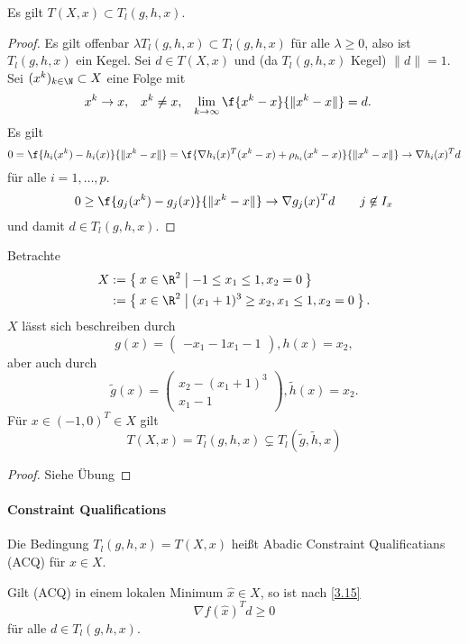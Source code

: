 \begin{lem} \label{3.17}
	Es gilt $T(X, x) \subset T_l(g,h,x)$.
	\begin{proof}
		Es gilt offenbar $\lambda T_l(g,h,x) \subset T_l(g,h,x)$ für alle $\lambda \ge 0$, also ist $T_l(g,h,x)$ ein Kegel.
		Sei $d \in T(X,x)$ und \oBdA (da $T_l(g,h,x)$ Kegel) $\|d\| = 1$.
		Sei $(x^k)_{k\in \N} \subset X$ eine Folge mit
		\begin{align*}
			x^k &\to x, &
			x^k &\neq x, &
			\lim_{k\to\infty} \f{x^k - x}{\|x^k-x\|} &= d.
		\end{align*}
		Es gilt
		\[
			0
			= \f{h_i(x^k) - h_i(x)}{\|x^k - x\|}
			= \f{\nabla h_i(x)^T(x^k-x) + \rho_{h_i}(x^k-x)}{\|x^k-x\|}
			\to \nabla h_i(x)^T d
		\]
		für alle $i = 1, \dotsc, p$.
		\[
			0
			\ge \f{g_j(x^k) - g_j(x)}{\|x^k-x\|}
			\to \nabla g_j(x)^T d
			\qquad j \not\in I_x
		\]
		und damit $d \in T_l(g,h,x)$.
	\end{proof}
\end{lem}

\begin{ex} \label{3.18}
	Betrachte
	\begin{align*}
		X &:= \Set{ x \in \R^2 | -1 \le x_1 \le 1, x_2 = 0 } \\
		&:= \Set{ x \in \R^2 | (x_1 + 1)^3 \ge x_2, x_1 \le 1, x_2 = 0 }.
	\end{align*}
	$X$ lässt sich beschreiben durch
	\[
		g(x) = \begin{pmatrix}
			- x_1 - 1
			x_1 - 1
		\end{pmatrix},
		h(x) = x_2,
	\]
	aber auch durch
	\[
		\tilde g(x) = \begin{pmatrix}
			x_2 - (x_1 + 1)^3 \\
			x_1 - 1
		\end{pmatrix},
		\tilde h(x) = x_2.
	\]
	Für $x \in (-1, 0)^T \in X$ gilt
	\[
		T(X, x) = T_l(g,h,x) \subsetneq T_l(\tilde g, \tilde h, x)
	\]
	\begin{proof}
		Siehe Übung
	\end{proof}
\end{ex}

\paragraph{Constraint Qualifications}

\begin{df} \label{3.19}
	Die Bedingung $T_l(g,h,x) = T(X,x) \label{acq}$ heißt Abadic Constraint Qualificatians (ACQ) für $x \in X$.

	Gilt (ACQ) in einem lokalen Minimum $\hat x \in X$, so ist nach \ref{3.15}
	\[
		\nabla f(\hat x)^T d \ge 0
	\]
	für alle $d \in T_l(g,h,x)$.
\end{df}

